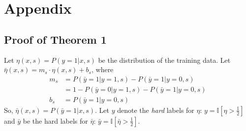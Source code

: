 
\section{Appendix}\label{sec:tuning-appendix}
\subsection{Proof of Theorem 1}
Let $\eta(x,s)=P(y=1|x,s)$ be the distribution of the training data.
Let $\bar{\eta}(x, s)=m_s\cdot\eta(x,s)+b_s$, where
\begin{align}
  m_s&=P(\bar{y}=1|y=1,s)-P(\bar{y}=1|y=0,s)\nonumber\\
  &=1-P(\bar{y}=0|y=1,s)-P(\bar{y}=1|y=0,s)\\
  b_s&=P(\bar{y}=1|y=0,s)
\end{align}
So, $\bar{\eta}(x, s)=P(\bar{y}=1|x, s)$.
Let $y$ denote the \emph{hard} labels for $\eta$: $y=\mathbb{I}\left[\eta>\tfrac{1}{2}\right]$ and $\bar{y}$ be the hard labels for $\bar{\eta}$: $\bar{y}=\mathbb{I}\left[\bar{\eta}>\tfrac{1}{2}\right]$.

